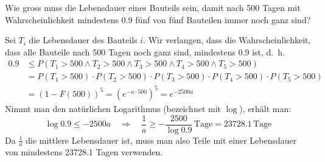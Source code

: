Wie gross muss die Lebensdauer eines Bauteils sein, damit nach 500
Tagen mit Wahrscheinlichkeit mindestens 0.9 fünf von fünf Bauteilen
immer noch ganz sind?


\begin{loesung}
Sei $T_i$ die Lebensdauer des Bauteils $i$. Wir verlangen, dass
die Wahrscheinlichkeit, dass alle Bauteile nach 500 Tagen noch
ganz sind, mindestens 0.9 ist, d.~h.
\begin{align*}
0.9
&\le
P(
T_1 > 500
\wedge
T_2 > 500
\wedge
T_3 > 500
\wedge
T_4 > 500
\wedge
T_5 > 500)
\\
&=
P(T_1 > 500)
\cdot
P(T_2 > 500)
\cdot
P(T_3 > 500)
\cdot
P(T_4 > 500)
\cdot
P(T_5 > 500)
\\
&=(1-F(500))^5=(e^{-a\cdot 500})^5=e^{-2500a}
\end{align*}
Nimmt man den natürlichen Logarithmus (bezeichnet mit $\log$),
erhält man:
\[
\log 0.9\le -2500 a\quad\Rightarrow\quad \frac1a \ge -\frac{2500}{\log 0.9}
\,\text{Tage}
=23728.1
\,
\text{Tage}
\]
Da $\frac1a$ die mittlere Lebensdauer ist, muss man also Teile mit
einer Lebensdauer von mindestens 23728.1 Tagen verwenden.
\end{loesung}

